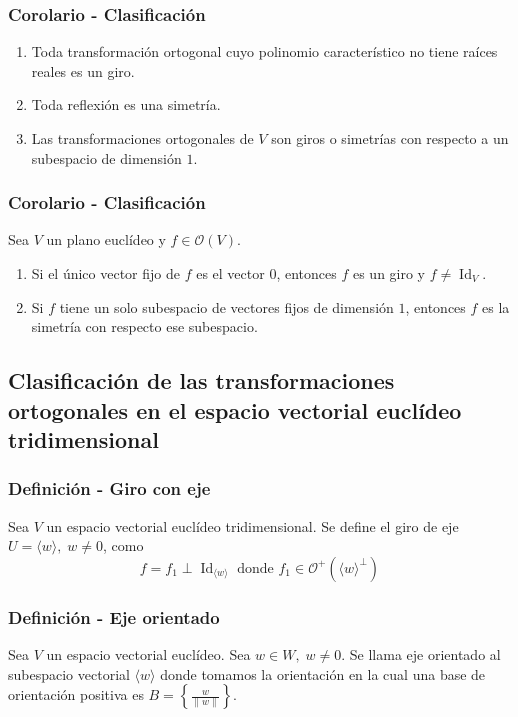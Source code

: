 \documentclass[12pt, a4paper, ones, notitlepage, openany,titlepage]{article}
\begin{document}
\subsubsection{Corolario - Clasificación}
\begin{enumerate}[label=(\arabic*)]
	\item Toda transformación ortogonal cuyo polinomio característico  no tiene raíces reales es un giro.
	\item Toda reflexión es una simetría.
	\item Las transformaciones ortogonales de $V$ son giros o simetrías con respecto a un subespacio de dimensión $1$.
\end{enumerate}

\subsubsection{Corolario - Clasificación}
\noindent Sea $V$ un plano euclídeo y $f \in \mathcal{O}(V)$.
\begin{enumerate}[label=(\arabic*)]
	\item Si el único vector fijo de $f$ es el vector $0$, entonces $f$ es un giro y $f \neq \operatorname{Id}_V$.
	\item Si $f$ tiene un solo subespacio de vectores fijos de dimensión $1$, entonces $f$ es la simetría con respecto ese subespacio.
\end{enumerate}

\subsection{Clasificación de las transformaciones ortogonales en el espacio vectorial euclídeo tridimensional}

\subsubsection{Definición - Giro con eje}
Sea $V$ un espacio vectorial euclídeo tridimensional. Se define el giro de eje $U = \langle w \rangle, \; w \neq 0$, como
$$
f = f_1 \perp \operatorname{Id}_{\langle w \rangle} \text{ donde } f_1 \in \mathcal{O}^+(\langle w \rangle^\perp)
$$

\subsubsection{Definición - Eje orientado}
Sea $V$ un espacio vectorial euclídeo. Sea $w \in W, \; w \neq 0$. Se llama eje orientado al subespacio vectorial $\langle w \rangle$ donde tomamos la orientación en la cual una base de orientación positiva es $\displaystyle B = \left\{ \frac{w}{\|w\|} \right\}$.
\end{document}
